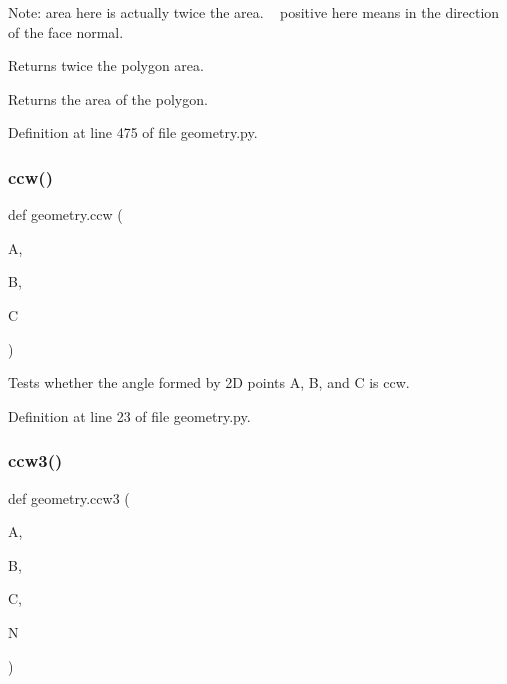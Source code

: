 Note\+: area here is actually twice the area. ~\newline
 positive here means in the direction of the face normal.

\begin{DoxyReturn}{Returns}
twice the polygon area.\begin{DoxyVerb}Returns the area of the polygon.\end{DoxyVerb}
 
\end{DoxyReturn}


Definition at line 475 of file geometry.\+py.

\mbox{\label{namespacegeometry_ad67511f31b70990660efd63da577f482}} 
\subsubsection{\texorpdfstring{ccw()}{ccw()}}
{\footnotesize\ttfamily def geometry.\+ccw (\begin{DoxyParamCaption}\item[{}]{A,  }\item[{}]{B,  }\item[{}]{C }\end{DoxyParamCaption})}

\begin{DoxyVerb}Tests whether the angle formed by 2D points A, B, and C is ccw.\end{DoxyVerb}
 

Definition at line 23 of file geometry.\+py.

\mbox{\label{namespacegeometry_a826edf3113b2277f596bc7927da2fd4e}} 
\subsubsection{\texorpdfstring{ccw3()}{ccw3()}}
{\footnotesize\ttfamily def geometry.\+ccw3 (\begin{DoxyParamCaption}\item[{}]{A,  }\item[{}]{B,  }\item[{}]{C,  }\item[{}]{N }\end{DoxyParamCaption})}

